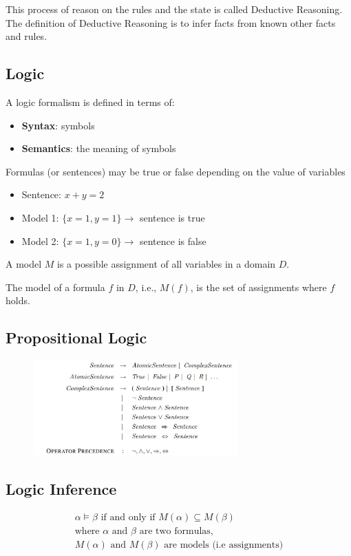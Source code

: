 This process of reason on the rules and the state is called Deductive Reasoning.
The definition of Deductive Reasoning is to infer facts from known other facts and rules.

\subsection{Logic}
A logic formalism is defined in terms of:
\begin{itemize}
    \item \textbf{Syntax}: symbols
    \item \textbf{Semantics}: the meaning of symbols
\end{itemize}
Formulas (or sentences) may be true or false depending on the value of variables
\begin{itemize}
    \item Sentence: $x+y=2$
    \item Model 1: $\{x=1,y=1\}\rightarrow$ sentence is true
    \item Model 2: $\{x=1,y=0\}\rightarrow$ sentence is false
\end{itemize}
A model $M$ is a possible assignment of all variables in a domain $D$.

The model of a formula $f$ in $D$, i.e., $M(f)$, is the set of assignments where $f$ holds.

\subsection{Propositional Logic}
\begin{figure}[H]
    \includegraphics[width=0.7\textwidth]{img/proplogic.png}
    \centering
\end{figure}

\subsection{Logic Inference}

\begin{eqnarray*}
    \alpha \models \beta \text{ if and only if } M(\alpha)\subseteq M(\beta)\\
    \text{where } \alpha \text{ and } \beta \text{ are two formulas, } \\
    M(\alpha) \text{ and } M(\beta) \text{ are models (i.e assignments)}
\end{eqnarray*}

